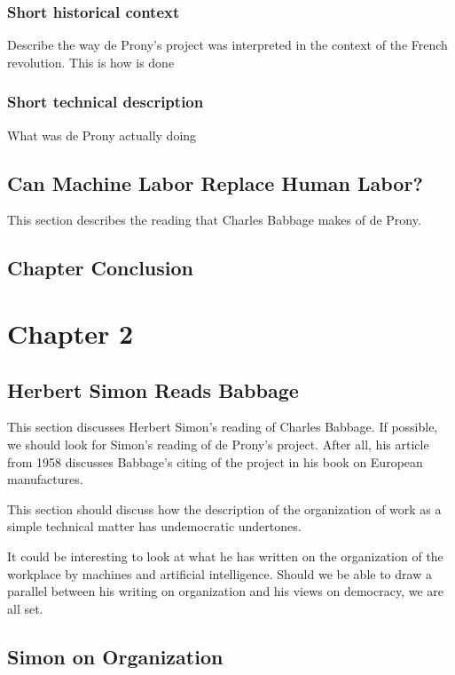\documentclass[version=last,draft=true,paper=A4,portrait,twoside=true,twocolumn=true,headinclude=false,footinclude=false,fontsize=10,BCOR=20mm,DIV=13,pagesize=auto,titlepage=false,mpinclude=false,open=right,chapterprefix=true,numbers=autoendperiod,headsepline=false,parskip=false]{scrbook}
\begin{document}
\printbibliography[heading=none,keyword=chapter-1.1]
\subsection{Short historical context}
\label{sec:org0950f0e}
Describe the way de Prony's project was interpreted in the context of the
French revolution. This is how is done 
\subsection{Short technical description}
\label{sec:org1ef6fa7}
What was de Prony actually doing
\section{Can Machine Labor Replace Human Labor?}
\label{sec:org254f578}
This section describes the reading that Charles Babbage makes of de Prony. 

\printbibliography[heading=none,keyword=chapter-1.2]
\section{Chapter Conclusion}
\label{sec:org949ebd2}
\chapter{Chapter 2}
\label{sec:org5fe0715}
\section{Herbert Simon Reads Babbage}
\label{sec:org47523dd}
This section discusses Herbert Simon's reading of Charles Babbage. If
possible, we should look for Simon's reading of de Prony's project. After
all, his article from 1958 discusses Babbage's citing of the project in his
book on European manufactures.

This section should discuss how the description of the organization of work
as a simple technical matter has undemocratic undertones. 

It could be interesting to look at what he has written on the organization
of the workplace by machines and artificial intelligence. Should we be able
to draw a parallel between his writing on organization and his views on
democracy, we are all set. 

\printbibliography[heading=none,keyword=chapter-2]
\section{Simon on Organization}
\label{sec:orgf0b029e}
\printbibliography[heading=none,keyword=chapter-2.1]
\end{document}
